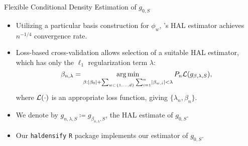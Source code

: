 \documentclass{beamer}
\begin{document}
\begin{frame}[c]{Flexible Conditional Density Estimation of $g_{0,S}$}

\begin{center}
\begin{itemize}
  \itemsep8pt
  \item Utilizing a particular basis construction for $\phi_w$,
    \citet{vdl2017generally}'s HAL estimator achieves $n^{-1/4}$
    convergence rate\footnotemark.
  \item Loss-based cross-validation allows selection of a suitable HAL
    estimator, which has only the $\ell_1$ regularization term $\lambda$:
    {\small{
    \begin{equation*}
      \beta_{n, \lambda}= \operatorname*{arg\,min}_{\beta: \lvert \beta_0 \rvert + \sum_{w
        \subset\{1,\ldots,d\}} \sum_{i=1}^{n} \lvert \beta_{w,i} \rvert <
        \lambda} P_n \mathcal{L}(g_{\beta,\lambda,S}),
    \end{equation*} }
    }
    where $\mathcal{L}(\cdot)$ is an appropriate loss function, giving
    $\{\lambda_n, \beta_n\}$.
  \item We denote by $g_{n,\lambda,S} \coloneqq g_{\beta_{n, \lambda},S}$, the
    HAL estimate of $g_{0,S}$.
  \item Our \texttt{haldensify} \texttt{R} package implements our estimator of
    $g_{0,S}$.
\end{itemize}
\end{center}



\end{frame}


\end{document}

